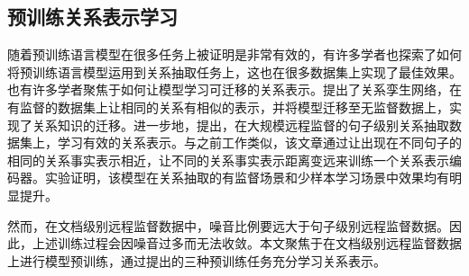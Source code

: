\subsection{预训练关系表示学习}
随着预训练语言模型在很多任务上被证明是非常有效的，有许多学者\cite{du2018multi,wu2019enriching}也探索了如何将预训练语言模型运用到关系抽取任务上，这也在很多数据集上实现了最佳效果。也有许多学者聚焦于如何让模型学习可迁移的关系表示。\citet{wu2019open}提出了关系孪生网络，在有监督的数据集上让相同的关系有相似的表示，并将模型迁移至无监督数据上，实现了关系知识的迁移。进一步地，\citet{soares2019matching}提出，在大规模远程监督的句子级别关系抽取数据集上，学习有效的关系表示。与之前工作类似，该文章通过让出现在不同句子的相同的关系事实表示相近，让不同的关系事实表示距离变远来训练一个关系表示编码器。实验证明，该模型在关系抽取的有监督场景和少样本学习场景中效果均有明显提升。

然而，在文档级别远程监督数据中，噪音比例要远大于句子级别远程监督数据。因此，上述训练过程会因噪音过多而无法收敛。本文聚焦于在文档级别远程监督数据上进行模型预训练，通过提出的三种预训练任务充分学习关系表示。









